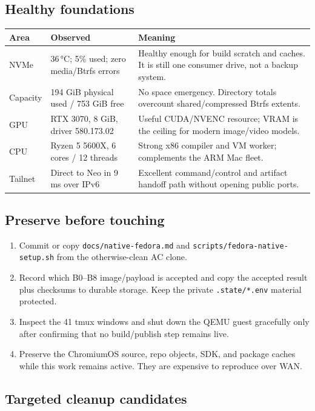 \documentclass[11pt,letterpaper]{article}
\newcommand{\mono}[1]{\texttt{#1}}
\begin{document}
\subsection{Healthy foundations}

\begin{tabularx}{\textwidth}{@{}L{1.35in}L{1.35in}Y@{}}
\toprule
\textbf{Area} & \textbf{Observed} & \textbf{Meaning} \\
\midrule
NVMe & 36\,°C; 5\% used; zero media/Btrfs errors & Healthy enough for build scratch and caches. It is still one consumer drive, not a backup system. \\
Capacity & 194 GiB physical used / 753 GiB free & No space emergency. Directory totals overcount shared/compressed Btrfs extents. \\
GPU & RTX 3070, 8 GiB, driver 580.173.02 & Useful CUDA/NVENC resource; VRAM is the ceiling for modern image/video models. \\
CPU & Ryzen 5 5600X, 6 cores / 12 threads & Strong x86 compiler and VM worker; complements the ARM Mac fleet. \\
Tailnet & Direct to Neo in 9 ms over IPv6 & Excellent command/control and artifact handoff path without opening public ports. \\
\bottomrule
\end{tabularx}

\subsection{Preserve before touching}

\begin{enumerate}
  \item Commit or copy \mono{docs/native-fedora.md} and \mono{scripts/fedora-native-setup.sh} from the otherwise-clean AC clone.
  \item Record which B0--B8 image/payload is accepted and copy the accepted result plus checksums to durable storage. Keep the private \mono{.state/*.env} material protected.
  \item Inspect the 41 tmux windows and shut down the QEMU guest gracefully only after confirming that no build/publish step remains live.
  \item Preserve the ChromiumOS source, repo objects, SDK, and package caches while this work remains active. They are expensive to reproduce over WAN.
\end{enumerate}

\subsection{Targeted cleanup candidates}
\end{document}
